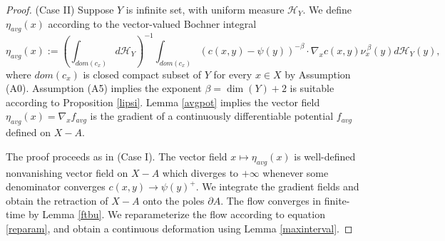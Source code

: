 \documentclass[12pt]{amsart}
\newtheorem{lem}{Lemma}
\theoremstyle{definition}
\theoremstyle{remark}
\newcommand{\del}{\partial}
\begin{document}
\begin{proof}





(Case II) Suppose $Y$ is infinite set, with uniform measure $\mathscr{H}_Y$. We define $\eta_{avg}(x)$ according to the vector-valued Bochner integral \begin{equation}
\eta_{avg}(x):=(\int_{dom(c_{x})} d\mathscr{H}_Y)^{-1} \int_{dom(c_{x})} (c(x,y)-\psi(y))^{-\beta}\cdot\nabla_x c(x,y) \nu^{~\beta}_x (y)d\mathscr{H}_Y(y),  \label{avgII} \end{equation} where $dom(c_x)$ is closed compact subset of $Y$ for every $x\in X$ by Assumption (A0). Assumption (A5) implies the exponent $\beta=\dim(Y)+2$ is suitable according to Proposition \ref{lipsi}. Lemma \ref{avgpot} implies the vector field $\eta_{avg}(x)=\nabla_x f_{avg}$ is the gradient of a continuously differentiable potential $f_{avg}$ defined on $X-A$.


The proof proceeds as in (Case I). The vector field $x\mapsto \eta_{avg}(x)$ is well-defined nonvanishing vector field on $X-A$ which diverges to $+\infty$ whenever some denominator converges $c(x,y) \to \psi(y)^+$. We integrate the gradient fields and obtain the retraction of $X-A$ onto the poles $\del A$. The flow converges in finite-time by Lemma \ref{ftbu}. We reparameterize the flow according to equation \eqref{reparam}, and obtain a continuous deformation using Lemma \ref{maxinterval}.
\end{proof}


\end{document}
